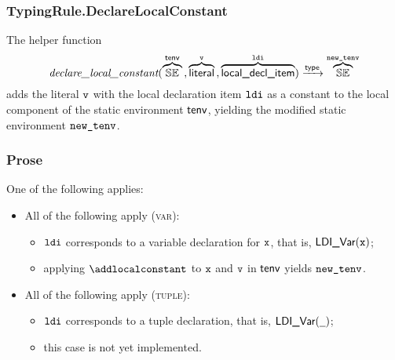 \begin{mathpar}
\end{mathpar}

\subsubsection{TypingRule.DeclareLocalConstant \label{sec:TypingRule.DeclareLocalConstant}}
\hypertarget{def-declarelocalconstant}{}
The helper function
\[
\declarelocalconstant(\overname{\staticenvs}{\tenv} \aslsep \overname{\literal}{\vv} \aslsep \overname{\localdeclitem}{\ldi})
\typearrow \overname{\staticenvs}{\newtenv}
\]
adds the literal $\vv$ with the local declaration item $\ldi$ as a constant to the local component of the static environment $\tenv$,
yielding the modified static environment $\newtenv$.

\subsubsection{Prose}
One of the following applies:
\begin{itemize}
  \item All of the following apply (\textsc{var}):
  \begin{itemize}
    \item $\ldi$ corresponds to a variable declaration for $\vx$, that is, $\LDIVar(\vx)$;
    \item applying $\addlocalconstant$ to $\vx$ and $\vv$ in $\tenv$ yields $\newtenv$.
  \end{itemize}

  \item All of the following apply (\textsc{tuple}):
  \begin{itemize}
    \item $\ldi$ corresponds to a tuple declaration, that is, $\LDIVar(\Ignore)$;
    \item this case is not yet implemented.
  \end{itemize}
\end{itemize}

